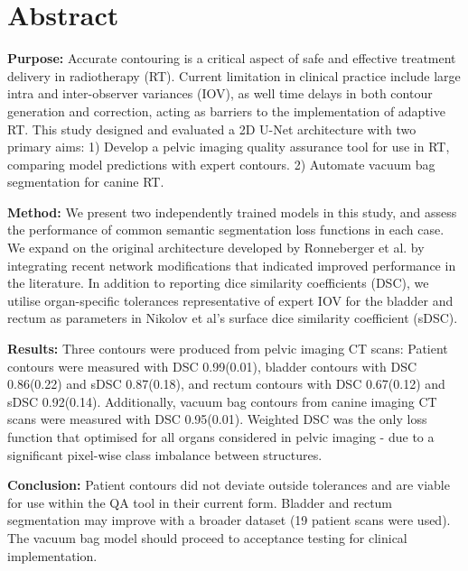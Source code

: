 \chapter{Abstract} \label{ch:abstract}

\textbf{Purpose:} Accurate contouring is a critical aspect of safe and effective
treatment delivery in radiotherapy (RT). Current limitation in clinical practice
include large intra and inter-observer variances (IOV), as well time delays in
both contour generation and correction, acting as barriers to the implementation
of adaptive RT. This study designed and evaluated a 2D U-Net architecture with
two primary aims: 1) Develop a pelvic imaging quality assurance tool for use in
RT, comparing model predictions with expert contours. 2) Automate vacuum bag
segmentation for canine RT.

\textbf{Method:} We present two independently trained models in this study, and
assess the performance of common semantic segmentation loss functions in each
case. We expand on the original architecture developed by Ronneberger et al. by
integrating recent network modifications that indicated improved performance in
the literature. In addition to reporting dice similarity coefficients (DSC), we
utilise organ-specific tolerances representative of expert IOV for the bladder
and rectum as parameters in Nikolov et al's surface dice similarity coefficient
(sDSC).

\textbf{Results:} Three contours were produced from pelvic imaging CT scans:
Patient contours were measured with DSC 0.99(0.01), bladder contours with
DSC 0.86(0.22) and sDSC 0.87(0.18), and rectum contours with DSC 0.67(0.12)
and sDSC 0.92(0.14).  Additionally, vacuum bag contours from canine imaging CT
scans were measured with DSC 0.95(0.01). Weighted DSC was the only loss function
that optimised for all organs considered in pelvic imaging - due to a
significant pixel-wise class imbalance between structures.

\textbf{Conclusion:} Patient contours did not deviate outside tolerances and are
viable for use within the QA tool in their current form.  Bladder and rectum
segmentation may improve with a broader dataset (19 patient scans were used).
The vacuum bag model should proceed to acceptance testing for clinical
implementation.
